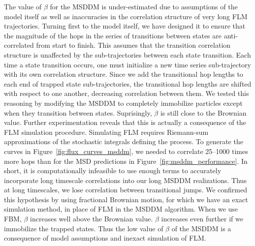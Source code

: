 \documentclass[12pt]{article}
\begin{document}
  The value of $\beta$ for the MSDDM is under-estimated due to assumptions of the model
  itself as well as inaccuracies in the correlation structure of very long FLM trajectories.
  Turning first to the model itself, we have designed it to ensure that the magnitude of the
  hops in the series of transitions between states are anti-correlated from start to finish. 
  This assumes that the transition correlation structure is unaffected by the
  sub-trajectories between each state transition. Each time a state transition occurs, one
  must initialize a new time series sub-trajectory with its own correlation structure. 
  Since we add the transitional hop lengths to each end of
  trapped state sub-trajectories, the transitional hop lengths are shifted with respect 
  to one another, decreasing correlation between them. We tested this reasoning by modifying the 
  MSDDM to completely immobilize particles except when they transition between states. 
  Suprisingly, $\beta$ is still close to the Brownian value. Further experimentation 
  reveals that this is actually a consequence of the FLM simulation procedure. Simulating
  FLM requires Riemann-sum approximations of the stochastic integrals defining the process.
  To generate the curves in Figure~\ref{fig:flux_curves_msddm}, we needed to correlate 
  25--1000 times more hops than for the MSD predictions in Figure~\ref{fig:msddm_performance}. 
  In short, it is computationally infeasible to use enough terms to accurately incorporate
  long timescale correlations into our long MSDDM realizations. Thus at long timescales, 
  we lose correlation between transitional jumps. We confirmed this hypothesis by using 
  fractional Brownian motion, for which we have an exact simulation method, in place of 
  FLM in the MSDDM algorithm. When we use FBM, $\beta$ increases well above the Brownian 
  value. $\beta$ increases even further if we immobilize the trapped states. Thus the low
  value of $\beta$ of the MSDDM is a consequence of model assumptions and inexact simulation
  of FLM.  
  
\end{document}
